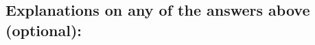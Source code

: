 \documentclass[]{jair}
\begin{document}

\subsection*{Explanations on any of the answers above (optional):}

\end{document}
